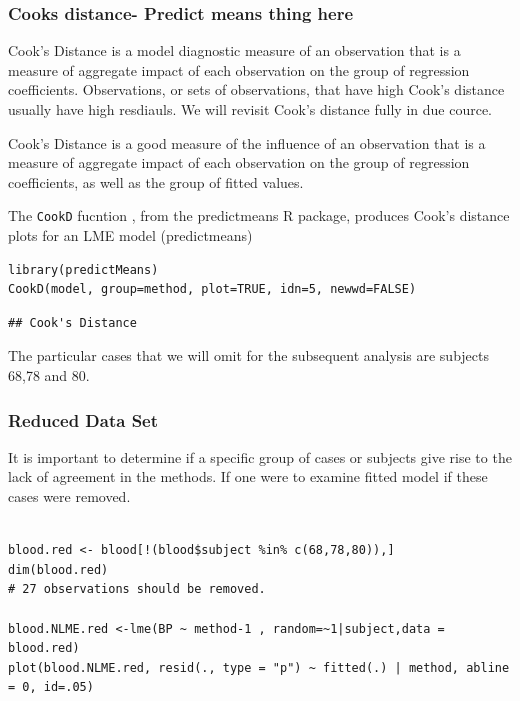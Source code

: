\subsubsection{Cooks distance- Predict means thing here}
Cook's Distance is a model diagnostic measure of an observation that is a measure of aggregate impact of each observation on the group of regression coefficients. Observations, or sets of observations, that have high Cook's distance usually have high resdiauls. We will revisit Cook's distance fully in due cource.

Cook's Distance is a good measure of the influence of an observation that is a measure of aggregate impact of each observation on the group of regression coefficients, as well as the group of fitted values.

The \texttt{CookD} fucntion , from the predictmeans R package, produces Cook’s distance plots for an LME model 
 (predictmeans)



\begin{framed}
\begin{verbatim}
library(predictMeans)
CookD(model, group=method, plot=TRUE, idn=5, newwd=FALSE)
\end{verbatim}
\end{framed}


\begin{verbatim}
## Cook's Distance

\end{verbatim}

The particular cases that we will omit for the subsequent analysis are subjects 68,78 and 80.

\subsubsection{Reduced Data Set}
It is important to determine if a specific group of cases or subjects give rise to the lack of agreement in the methods. If one were to examine fitted model if these cases were removed.

\begin{framed}
\begin{verbatim}

blood.red <- blood[!(blood$subject %in% c(68,78,80)),]
dim(blood.red)
# 27 observations should be removed.

blood.NLME.red <-lme(BP ~ method-1 , random=~1|subject,data = blood.red)
plot(blood.NLME.red, resid(., type = "p") ~ fitted(.) | method, abline = 0, id=.05)
\end{verbatim}
\end{framed}

